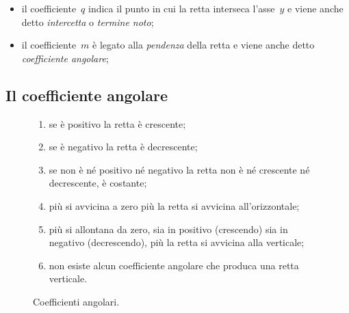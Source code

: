 \begin{itemize} [noitemsep]
 \item il coefficiente~\(q\) indica il punto in cui la retta interseca 
  l'asse~\(y\) e viene anche detto \emph{intercetta} o \emph{termine noto};
 \item il coefficiente~\(m\) è legato alla \emph{pendenza} della retta
  e viene anche detto \emph{coefficiente angolare};
\end{itemize}

\subsection{Il coefficiente angolare}


\begin{inaccessibleblock}
\begin{figure}[h]
{\noindent
\begin{minipage}{.58\textwidth}
\begin{enumerate} [nosep]
 \item se è positivo la retta è crescente;
 \item se è negativo la retta è decrescente;
 \item se non è né positivo né negativo la retta non è né crescente né
 decrescente, è costante;
 \item più si avvicina a zero più la retta si avvicina all'orizzontale;
 \item più si allontana da zero, sia in positivo (crescendo) sia in
  negativo (decrescendo), più la retta si avvicina alla verticale;
 \item non esiste alcun coefficiente angolare che produca 
  una retta verticale.
\end{enumerate}
\end{minipage}
\hfill
\begin{minipage}{.38\textwidth}
\begin{center} \coeffang \end{center}
\caption{Coefficienti angolari.}\label{fig:coeffang}
\end{minipage}
}
\end{figure}
\end{inaccessibleblock}


